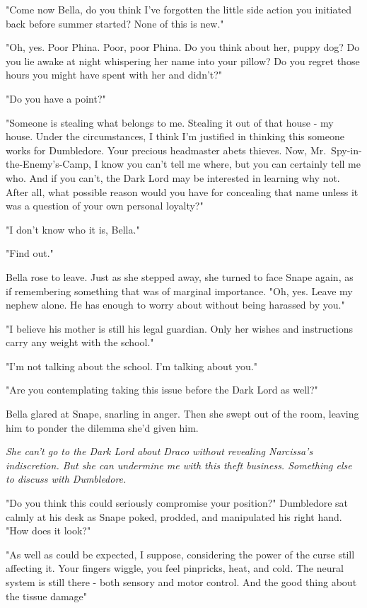"Come now Bella, do you think I've forgotten the little side action you initiated back before summer started? None of this is new."

"Oh, yes. Poor Phina. Poor, poor Phina. Do you think about her, puppy dog? Do you lie awake at night whispering her name into your pillow? Do you regret those hours you might have spent with her and didn't?"

"Do you have a point?"

"Someone is stealing what belongs to me. Stealing it out of that house - my house. Under the circumstances, I think I'm justified in thinking this someone works for Dumbledore. Your precious headmaster abets thieves. Now, Mr.~Spy-in-the-Enemy's-Camp, I know you can't tell me where, but you can certainly tell me who. And if you can't, the Dark Lord may be interested in learning why not. After all, what possible reason would you have for concealing that name{\el} unless it was a question of your own personal loyalty?"

"I don't know who it is, Bella."

"Find out."

Bella rose to leave. Just as she stepped away, she turned to face Snape again, as if remembering something that was of marginal importance. "Oh, yes. Leave my nephew alone. He has enough to worry about without being harassed by you."

"I believe his mother is still his legal guardian. Only her wishes and instructions carry any weight with the school."

"I'm not talking about the school. I'm talking about you."

"Are you contemplating taking this issue before the Dark Lord as well?"

Bella glared at Snape, snarling in anger. Then she swept out of the room, leaving him to ponder the dilemma she'd given him.

\emph{She can't go to the Dark Lord about Draco without revealing Narcissa's indiscretion. But she can undermine me with this theft business. Something else to discuss with Dumbledore.}

\sbreak

"Do you think this could seriously compromise your position?" Dumbledore sat calmly at his desk as Snape poked, prodded, and manipulated his right hand. "How does it look?"

"As well as could be expected, I suppose, considering the power of the curse still affecting it. Your fingers wiggle, you feel pinpricks, heat, and cold. The neural system is still there - both sensory and motor control. And the good thing about the tissue damage{\el}"

